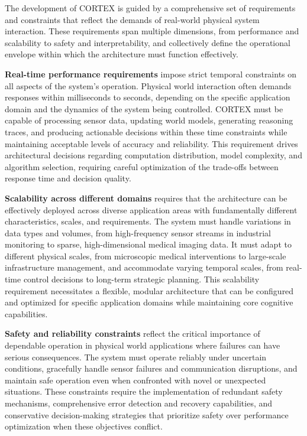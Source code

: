 The development of CORTEX is guided by a comprehensive set of requirements and constraints that reflect the demands of real-world physical system interaction. These requirements span multiple dimensions, from performance and scalability to safety and interpretability, and collectively define the operational envelope within which the architecture must function effectively.

\textbf{Real-time performance requirements} impose strict temporal constraints on all aspects of the system's operation. Physical world interaction often demands responses within milliseconds to seconds, depending on the specific application domain and the dynamics of the system being controlled. CORTEX must be capable of processing sensor data, updating world models, generating reasoning traces, and producing actionable decisions within these time constraints while maintaining acceptable levels of accuracy and reliability. This requirement drives architectural decisions regarding computation distribution, model complexity, and algorithm selection, requiring careful optimization of the trade-offs between response time and decision quality.

\textbf{Scalability across different domains} requires that the architecture can be effectively deployed across diverse application areas with fundamentally different characteristics, scales, and requirements. The system must handle variations in data types and volumes, from high-frequency sensor streams in industrial monitoring to sparse, high-dimensional medical imaging data. It must adapt to different physical scales, from microscopic medical interventions to large-scale infrastructure management, and accommodate varying temporal scales, from real-time control decisions to long-term strategic planning. This scalability requirement necessitates a flexible, modular architecture that can be configured and optimized for specific application domains while maintaining core cognitive capabilities.

\textbf{Safety and reliability constraints} reflect the critical importance of dependable operation in physical world applications where failures can have serious consequences. The system must operate reliably under uncertain conditions, gracefully handle sensor failures and communication disruptions, and maintain safe operation even when confronted with novel or unexpected situations. These constraints require the implementation of redundant safety mechanisms, comprehensive error detection and recovery capabilities, and conservative decision-making strategies that prioritize safety over performance optimization when these objectives conflict.

